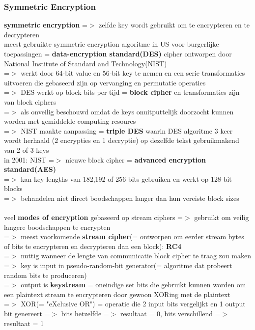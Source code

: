 \documentclass{report}
\begin{document}
\subsubsection{Symmetric Encryption}
\textbf{symmetric encryption} =$>$ zelfde key wordt gebruikt om te encrypteren en te decrypteren
\\meest gebruikte symmetric encryption algoritme in US voor burgerlijke toepassingen = \textbf{data-encryption standard(DES)} cipher ontworpen door National Institute of Standard and Technology(NIST)
\\=$>$ werkt door 64-bit value en 56-bit key te nemen en een serie transformaties uitvoeren die gebaseerd zijn op vervanging en permutatie operaties 
\\=$>$ DES werkt op block bits per tijd = \textbf{block cipher} en transformaties zijn van block ciphers
\\=$>$ als onveilig beschouwd omdat de keys onuitputtelijk doorzocht kunnen worden met gemiddelde computing resoures
\\=$>$ NIST maakte aanpassing = \textbf{triple DES} waarin DES algoritme 3 keer wordt herhaald (2 encrypties en 1 decryptie) op dezelfde tekst gebruikmakend van 2 of 3 keys
\\in 2001: NIST =$>$ nieuwe block cipher = \textbf{advanced encryption standard(AES)} 
\\=$>$ kan key lengths van 182,192 of 256 bits gebruiken en werkt op 128-bit blocks
\\=$>$ behandelen niet direct boodschappen langer dan hun vereiste block sizes
\\
\\veel \textbf{modes of encryption} gebaseerd op stream ciphers =$>$ gebruikt om veilig langere boodschappen te encrypten
\\=$>$ meest voorkomende \textbf{stream cipher}(= ontworpen om eerder stream bytes of bits te encrypteren en decrypteren dan een block): \textbf{RC4} 
\\=$>$ nuttig wanneer de lengte van communicatie block cipher te traag zou maken
\\=$>$ key is input in pseudo-random-bit generator(= algoritme dat probeert random bits te produceren)
\\=$>$ output is \textbf{keystream} = oneindige set bits die gebruikt kunnen worden om een plaintext stream te encrypteren door gewoon XORing met de plaintext
\\=$>$ XOR(= "eXclusive OR") = operatie die 2 input bits vergelijkt en 1 output bit genereert =$>$ bits hetzelfde =$>$ resultaat = 0, bits verschillend =$>$ resultaat = 1
\end{document}
